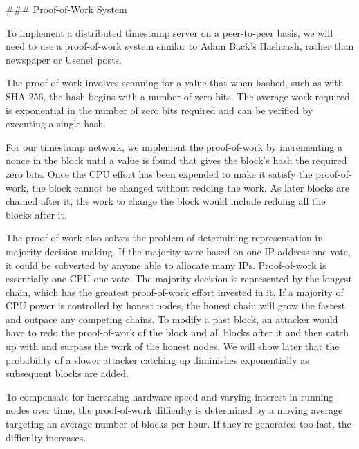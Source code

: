### Proof-of-Work System

To implement a distributed timestamp server on a peer-to-peer basis, we will need to use a proof-of-work system similar to Adam Back's Hashcash, rather than newspaper or Usenet posts.

The proof-of-work involves scanning for a value that when hashed, such as with SHA-256, the hash begins with a number of zero bits. The average work required is exponential in the number of zero bits required and can be verified by executing a single hash.

For our timestamp network, we implement the proof-of-work by incrementing a nonce in the block until a value is found that gives the block's hash the required zero bits. Once the CPU effort has been expended to make it satisfy the proof-of-work, the block cannot be changed without redoing the work. As later blocks are chained after it, the work to change the block would include redoing all the blocks after it.

The proof-of-work also solves the problem of determining representation in majority decision making. If the majority were based on one-IP-address-one-vote, it could be subverted by anyone able to allocate many IPs. Proof-of-work is essentially one-CPU-one-vote. The majority decision is represented by the longest chain, which has the greatest proof-of-work effort invested in it. If a majority of CPU power is controlled by honest nodes, the honest chain will grow the fastest and outpace any competing chains. To modify a past block, an attacker would have to redo the proof-of-work of the block and all blocks after it and then catch up with and surpass the work of the honest nodes. We will show later that the probability of a slower attacker catching up diminishes exponentially as subsequent blocks are added.

To compensate for increasing hardware speed and varying interest in running nodes over time, the proof-of-work difficulty is determined by a moving average targeting an average number of blocks per hour. If they're generated too fast, the difficulty increases.